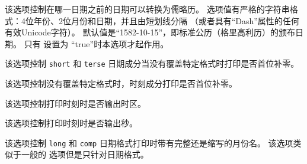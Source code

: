 \begin{optionlist}

该选项控制在哪一日期之前的日期可以转换为儒略历。
选项值有严格的字符串格式：4位年份、2位月份和日期，并且由短划线分隔
（或者具有“Dash”属性的任何有效Unicode字符）。
默认值是“1582-10-15”，即标准公历（格里高利历）的颁布日期。
只有  设置为 “true”时本选项才起作用。



该选项控制 \texttt{short} 和 \texttt{terse} 日期成分当没有覆盖特定格式时打印是否首位补零。


该选项控制没有覆盖特定格式时，时刻成分打印是否首位补零。


该选项控制打印时刻时是否输出时区。


该选项控制打印时刻时是否输出秒。



该选项控制 \texttt{long} 和 \texttt{comp} 日期格式打印时带有完整还是缩写的月份名。
该选项类似于一般的  选项但是只针对日期格式。




\end{optionlist}
